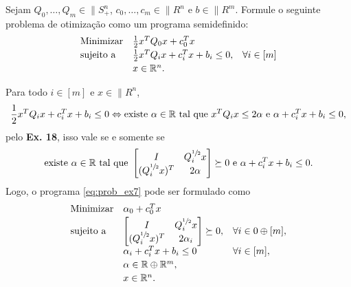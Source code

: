 \begin{homeworkProblem}
Sejam $Q_0, \dots, Q_m \in \|{S}_+^n$, $c_0, \dots, c_m \in \|{R}^n$ e $b \in \|{R}^m$. Formule o seguinte problema de otimização como um programa semidefinido:
\begin{equation} \label{eq:prob_ex7}
    \begin{array}[!h]{lll}
        \text{Minimizar} & \frac{1}{2}x^TQ_0x + c_0^Tx                                               & \\[2pt]
        \text{sujeito a} & \frac{1}{2}x^TQ_ix + c_i^Tx + b_i \leq 0,                                 & \forall i \in [m] \\[2pt]
                         & x \in \|{R}^n.                                                            & \\
    \end{array}
\end{equation}

\begin{homeworkProblemAnswer}
Para todo $i \in [m]$ e $x \in \|{R}^n$,
$$ 
    \frac{1}{2}x^TQ_ix + c_i^Tx + b_i \leq 0 \Leftrightarrow 
    \text{existe } \alpha \in \mathbb{R} \text{ tal que } x^TQ_ix \leq 2\alpha \text{ e } \alpha + c_i^Tx + b_i \leq 0,
$$
pelo \textbf{Ex. 18}, isso vale se e somente se
\begin{equation*}
    \text{existe } \alpha \in \mathbb{R} \text{ tal que }
    \begin{bmatrix}
    I                     & Q_i^{\sfrac{1}{2}}x \\
    (Q_i^{\sfrac{1}{2}}x)^T & 2\alpha
    \end{bmatrix}
    \succeq 0 \text{ e } \alpha + c_i^Tx + b_i \leq 0.
\end{equation*}
Logo, o programa \eqref{eq:prob_ex7} pode ser formulado como
\begin{equation*}
    \begin{array}[!h]{lll}
        \text{Minimizar} & \alpha_0 + c_0^Tx                                                         & \\[2pt]
        \text{sujeito a} & \begin{bmatrix}
                           I                     & Q_i^{\sfrac{1}{2}}x \\
                           (Q_i^{\sfrac{1}{2}}x)^T & 2\alpha_i
                           \end{bmatrix} \succeq 0,                                                  & \forall i \in 0 \oplus [m], \\[2pt]
                         & \alpha_i + c_i^Tx + b_i \leq 0                                            & \forall i \in [m], \\[2pt]
                         & \alpha \in \|{R} \oplus \|{R}^m,                                          & \\[2pt]
                         & x \in \|{R}^n.                                                            & \\
    \end{array}
\end{equation*}


\end{homeworkProblemAnswer}
\end{homeworkProblem}
